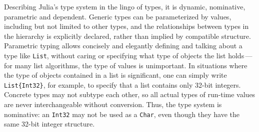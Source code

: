 \documentclass{article}
\begin{document}
Describing Julia's type system in the lingo of types, it is dynamic, nominative, parametric and dependent.
Generic types can be parameterized by values, including but not limited to other types, and the relationships between types in the hierarchy is explicitly declared, rather than implied by compatible structure.
Parametric typing allows concisely and elegantly defining and talking about a type like \verb|List|, without caring or specifying what type of objects the list holds\,---\,for many list algorithms, the type of values is unimportant.
In situations where the type of objects contained in a list is significant, one can simply write \verb|List{Int32}|, for example, to specify that a list contains only 32-bit integers.
Concrete types may not subtype each other, so all actual types of run-time values are never interchangeable without conversion.
Thus, the type system is nominative:
an \verb|Int32| may not be used as a \verb|Char|, even though they have the same 32-bit integer structure.
\end{document}
